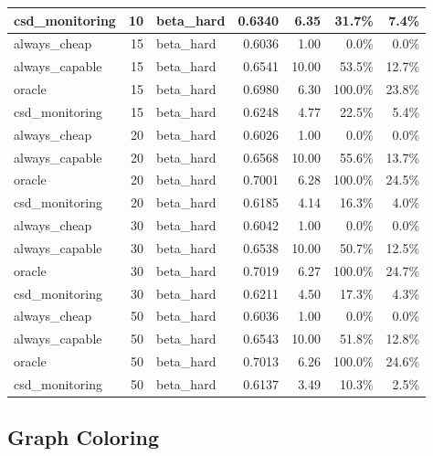 \documentclass[11pt]{article}
\begin{document}
\begin{table}[h]
\begin{tabular}{l|r|l|r|r|r|r}
\midrule
csd\_monitoring & 10 & beta\_hard & 0.6340 & 6.35 & 31.7\% & 7.4\% \\
\midrule
always\_cheap & 15 & beta\_hard & 0.6036 & 1.00 & 0.0\% & 0.0\% \\
\midrule
always\_capable & 15 & beta\_hard & 0.6541 & 10.00 & 53.5\% & 12.7\% \\
\midrule
oracle & 15 & beta\_hard & 0.6980 & 6.30 & 100.0\% & 23.8\% \\
\midrule
csd\_monitoring & 15 & beta\_hard & 0.6248 & 4.77 & 22.5\% & 5.4\% \\
\midrule
always\_cheap & 20 & beta\_hard & 0.6026 & 1.00 & 0.0\% & 0.0\% \\
\midrule
always\_capable & 20 & beta\_hard & 0.6568 & 10.00 & 55.6\% & 13.7\% \\
\midrule
oracle & 20 & beta\_hard & 0.7001 & 6.28 & 100.0\% & 24.5\% \\
\midrule
csd\_monitoring & 20 & beta\_hard & 0.6185 & 4.14 & 16.3\% & 4.0\% \\
\midrule
always\_cheap & 30 & beta\_hard & 0.6042 & 1.00 & 0.0\% & 0.0\% \\
\midrule
always\_capable & 30 & beta\_hard & 0.6538 & 10.00 & 50.7\% & 12.5\% \\
\midrule
oracle & 30 & beta\_hard & 0.7019 & 6.27 & 100.0\% & 24.7\% \\
\midrule
csd\_monitoring & 30 & beta\_hard & 0.6211 & 4.50 & 17.3\% & 4.3\% \\
\midrule
always\_cheap & 50 & beta\_hard & 0.6036 & 1.00 & 0.0\% & 0.0\% \\
\midrule
always\_capable & 50 & beta\_hard & 0.6543 & 10.00 & 51.8\% & 12.8\% \\
\midrule
oracle & 50 & beta\_hard & 0.7013 & 6.26 & 100.0\% & 24.6\% \\
\midrule
csd\_monitoring & 50 & beta\_hard & 0.6137 & 3.49 & 10.3\% & 2.5\% \\
\bottomrule
\end{tabular}
\end{table}

\subsection{Graph Coloring}
\end{document}
